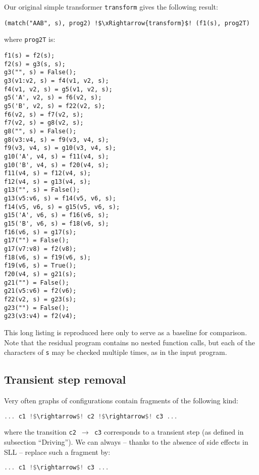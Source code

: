 Our original simple transformer \texttt{transform} gives the following result:
\begin{lstlisting}[language=sll,escapechar=!]
(match("AAB", s), prog2) !$\xRightarrow{transform}$! (f1(s), prog2T)
\end{lstlisting}
where \texttt{prog2T} is:
\begin{lstlisting}[language=sll]
f1(s) = f2(s);
f2(s) = g3(s, s);
g3("", s) = False();
g3(v1:v2, s) = f4(v1, v2, s);
f4(v1, v2, s) = g5(v1, v2, s);
g5('A', v2, s) = f6(v2, s);
g5('B', v2, s) = f22(v2, s);
f6(v2, s) = f7(v2, s);
f7(v2, s) = g8(v2, s);
g8("", s) = False();
g8(v3:v4, s) = f9(v3, v4, s);
f9(v3, v4, s) = g10(v3, v4, s);
g10('A', v4, s) = f11(v4, s);
g10('B', v4, s) = f20(v4, s);
f11(v4, s) = f12(v4, s);
f12(v4, s) = g13(v4, s);
g13("", s) = False();
g13(v5:v6, s) = f14(v5, v6, s);
f14(v5, v6, s) = g15(v5, v6, s);
g15('A', v6, s) = f16(v6, s);
g15('B', v6, s) = f18(v6, s);
f16(v6, s) = g17(s);
g17("") = False();
g17(v7:v8) = f2(v8);
f18(v6, s) = f19(v6, s);
f19(v6, s) = True();
f20(v4, s) = g21(s);
g21("") = False();
g21(v5:v6) = f2(v6);
f22(v2, s) = g23(s);
g23("") = False();
g23(v3:v4) = f2(v4);
\end{lstlisting}
This long listing is reproduced here only to serve as a baseline for comparison.
Note that the residual program contains no nested function calls,
but each of the characters of \texttt{s} may be checked multiple times, as in the input program.

\subsection{Transient step removal}

Very often graphs of configurations contain fragments of the following kind:
\begin{lstlisting}[language=haskell,escapechar=!]
... c1 !$\rightarrow$! c2 !$\rightarrow$! c3 ...
\end{lstlisting}
where the transition \texttt{c2 $\rightarrow$ c3} corresponds to a transient step 
(as defined in subsection ``Driving'').
We can always -- thanks to the absence of side effects in SLL -- replace such a fragment by:
\begin{lstlisting}[language=haskell,escapechar=!]
... c1 !$\rightarrow$! c3 ...
\end{lstlisting}

